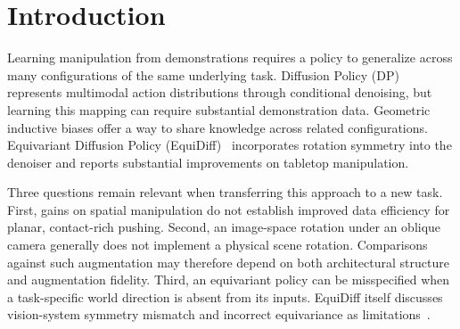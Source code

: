 \begin{abstract}
Equivariant diffusion policies encode geometric structure to improve robot
learning from demonstrations, but their advantage over augmentation depends on
whether the assumed transformations are valid for the task and observations.
We study this dependence in planar pushing using a Push-T environment with
validated discrete rotation symmetry and a renderer constructed to commute
with exact image rotations. Under a common update budget, we compare Diffusion
Policy (DP), DP with exact $C_4$ augmentation, and a Push-T adaptation of
Equivariant Diffusion Policy. Across three training seeds, equivariance does
not provide a statistically resolved advantage over DP at 25 or 50
demonstrations, whereas exact augmentation outperforms the equivariant model
by 0.2705 and 0.2322 mean coverage, respectively. Equivariance improves over
DP at 100 and 200 demonstrations; however, independent validation curves show
that its advantage over augmentation at 200 demonstrations diminishes with
additional training. A separate state-input study exposes a substantial cost
of symmetry mismatch: with a fixed, unobserved goal, the equivariant model
scores 0.4888 coverage versus 0.7869 for DP. Explicit goal conditioning and a
learnable world-frame reference recover part, but not all, of this deficit.
These findings identify task symmetry, observability, and optimization budget
as joint determinants of the value of architectural equivariance.
\end{abstract}

\section{Introduction}
\label{eqstudy:sec:intro}
Learning manipulation from demonstrations requires a policy to generalize
across many configurations of the same underlying task. Diffusion Policy
(DP)~\cite{chi2023diffusion} represents multimodal action distributions through
conditional denoising, but learning this mapping can require substantial
demonstration data. Geometric inductive biases offer a way to share knowledge
across related configurations. Equivariant Diffusion Policy
(EquiDiff)~\cite{wang2024equivariant} incorporates rotation symmetry into the
denoiser and reports substantial improvements on tabletop manipulation.

Three questions remain relevant when transferring this approach to a new task.
First, gains on spatial manipulation do not establish improved data efficiency
for planar, contact-rich pushing. Second, an image-space rotation under an
oblique camera generally does not implement a physical scene rotation.
Comparisons against such augmentation may therefore depend on both
architectural structure and augmentation fidelity. Third, an equivariant
policy can be misspecified when a task-specific world direction is absent
from its inputs. EquiDiff itself discusses vision-system symmetry mismatch
and incorrect equivariance as limitations~\cite{wang2024equivariant}.

